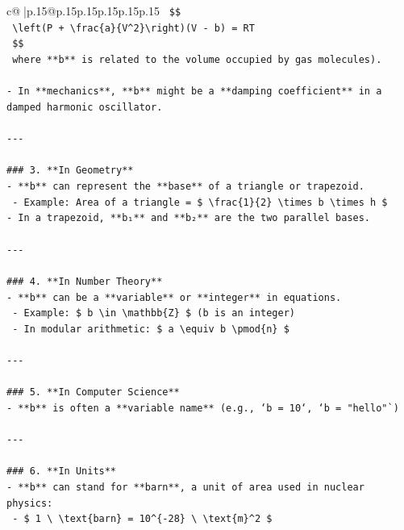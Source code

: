 \documentclass{article}
\begin{document}
{\begin{supertabular}{c@{$\;$}|p{.15\linewidth}@{}p{.15\linewidth}p{.15\linewidth}p{.15\linewidth}p{.15\linewidth}p{.15\linewidth}}
{{{\texttt{  \$\$} \\
\texttt{  \textbackslash{}left(P + \textbackslash{}frac\{a\}\{V\^{}2\}\textbackslash{}right)(V {-} b) = RT} \\
\texttt{  \$\$} \\
\texttt{  where **b** is related to the volume occupied by gas molecules).} \\
\\ 
\texttt{{-} In **mechanics**, **b** might be a **damping coefficient** in a damped harmonic oscillator.} \\
\\ 
\texttt{{-}{-}{-}} \\
\\ 
\texttt{\#\#\# 3. **In Geometry**} \\
\texttt{{-} **b** can represent the **base** of a triangle or trapezoid.} \\
\texttt{  {-} Example: Area of a triangle = \$ \textbackslash{}frac\{1\}\{2\} \textbackslash{}times b \textbackslash{}times h \$} \\
\texttt{{-} In a trapezoid, **b₁** and **b₂** are the two parallel bases.} \\
\\ 
\texttt{{-}{-}{-}} \\
\\ 
\texttt{\#\#\# 4. **In Number Theory**} \\
\texttt{{-} **b** can be a **variable** or **integer** in equations.} \\
\texttt{  {-} Example: \$ b \textbackslash{}in \textbackslash{}mathbb\{Z\} \$ (b is an integer)} \\
\texttt{  {-} In modular arithmetic: \$ a \textbackslash{}equiv b \textbackslash{}pmod\{n\} \$} \\
\\ 
\texttt{{-}{-}{-}} \\
\\ 
\texttt{\#\#\# 5. **In Computer Science**} \\
\texttt{{-} **b** is often a **variable name** (e.g., `b = 10`, `b = "hello"`)} \\
\\ 
\texttt{{-}{-}{-}} \\
\\ 
\texttt{\#\#\# 6. **In Units**} \\
\texttt{{-} **b** can stand for **barn**, a unit of area used in nuclear physics:} \\
\texttt{  {-} \$ 1 \textbackslash{} \textbackslash{}text\{barn\} = 10\^{}\{{-}28\} \textbackslash{} \textbackslash{}text\{m\}\^{}2 \$} \\
}}}
\end{supertabular}}
\end{document}
